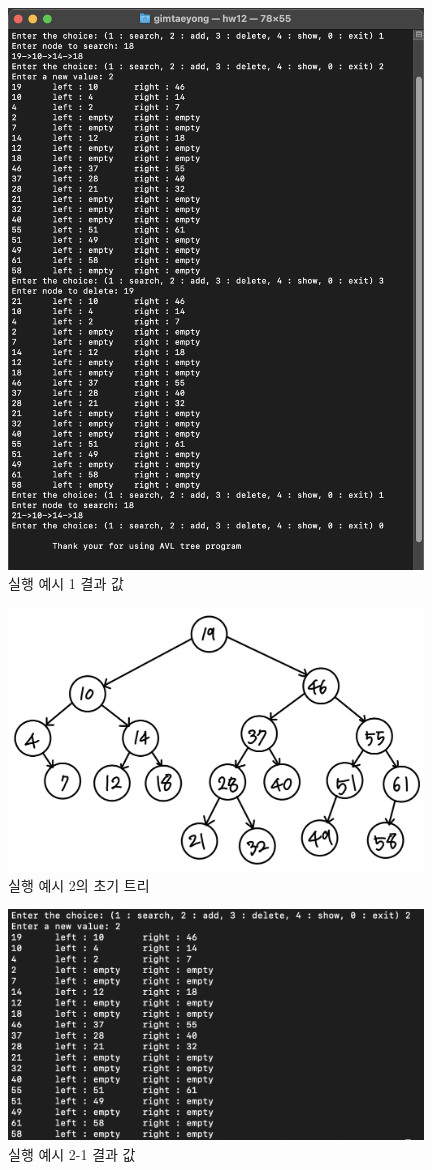 \documentclass{article}
\begin{document}
\begin{figure}
\centering
   \includegraphics[width=11cm]{ex_1.png}
   \hfil
\caption{실행 예시 1 결과 값}
\label{ex1}
\end{figure}

\begin{figure}
\centering
   \includegraphics[width=11cm]{tree-1.jpeg}
   \hfil
\caption{실행 예시 2의 초기 트리}
\label{tree-1}
\end{figure}

\begin{figure}
\centering
   \includegraphics[width=11cm]{ex_2-1.png}
   \hfil
\caption{실행 예시 2-1 결과 값}
\label{ex2-1}
\end{figure}
\end{document}
